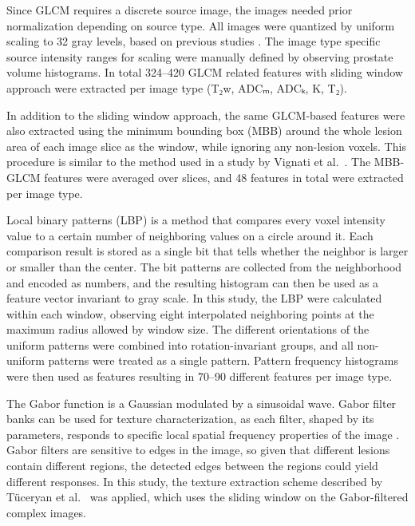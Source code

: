\documentclass[10pt,letterpaper]{article}
\newcommand{\citep}{\cite}
\begin{document}
Since GLCM requires a discrete source image, the images needed prior
normalization depending on source type. All images were quantized by uniform
scaling to 32 gray levels, based on previous studies \citep{Clausi2002Analysis,
Clausi2002Rapid, Albregtsen2008}. The image type specific source intensity
ranges for scaling were manually defined by observing prostate volume
histograms. In total 324--420 GLCM related features with sliding window approach
were extracted per image type (T₂w, ADCₘ, ADCₖ, K, T₂).

In addition to the sliding window approach, the same GLCM-based features were
also extracted using the minimum bounding box (MBB) around the whole lesion
area of each image slice as the window, while ignoring any non-lesion voxels.
This procedure is similar to the method used in a study by Vignati et
al.\ \cite{Vignati2015}. The MBB-GLCM features were averaged over slices, and
48 features in total were extracted per image type.

Local binary patterns (LBP) \citep{Ojala1996} is a method that compares every
voxel intensity value to a certain number of neighboring values on a circle
around it. Each comparison result is stored as a single bit that tells whether
the neighbor is larger or smaller than the center. The bit patterns are
collected from the neighborhood and encoded as numbers, and the resulting
histogram can then be used as a feature vector invariant to gray scale. In this
study, the LBP were calculated within each window, observing eight interpolated
neighboring points at the maximum radius allowed by window size. The different
orientations of the uniform patterns were combined into rotation-invariant
groups, and all non-uniform patterns were treated as a single pattern. Pattern
frequency histograms were then used as features resulting in 70--90 different
features per image type.

The Gabor function \citep{Gabor1946} is a Gaussian modulated by a sinusoidal
wave. Gabor filter banks can be used for texture characterization, as each
filter, shaped by its parameters, responds to specific local spatial frequency
properties of the image \citep{Turner1986}. Gabor filters are sensitive to edges
in the image, so given that different lesions contain different regions, the
detected edges between the regions could yield different responses. In this
study, the texture extraction scheme described by Tüceryan et
al.\ \cite{Tuceryan1998} was applied, which uses the sliding window on the
Gabor-filtered complex images.
\end{document}
